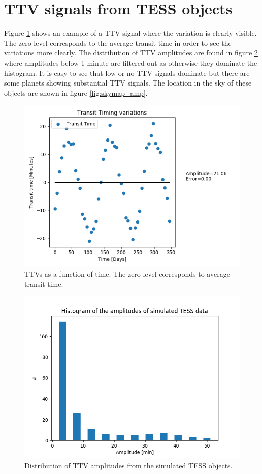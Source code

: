 \documentclass[12pt]{report}
\begin{document}
\section{TTV signals from TESS objects}
	Figure \ref{fig:TTV1} shows an example of a TTV signal where the variation is clearly visible. The zero level corresponds to the average transit time in order to see the variations more clearly. The distribution of TTV amplitudes are found in figure \ref{fig:ampl_histo} where amplitudes below 1 minute are filtered out as otherwise they dominate the histogram. It is easy to see that low or no TTV signals dominate but there are some planets showing substantial TTV signals. The location in the sky of these objects are shown in figure \ref{fig:skymap_amp}.
\begin{figure}[h]
 	 \centering
	  \includegraphics[width=\textwidth]{img/215_1.png}
	  \caption{TTVs as a function of time. The zero level corresponds to average transit time.}
	 \label{fig:TTV1}
\end{figure}
\begin{figure}[h!]
 	 \centering
	  \includegraphics[width=\textwidth]{img/ampl_histo2.png}
	  \caption{Distribution of TTV amplitudes from the simulated TESS objects.}
	 \label{fig:ampl_histo}
\end{figure}
\end{document}
